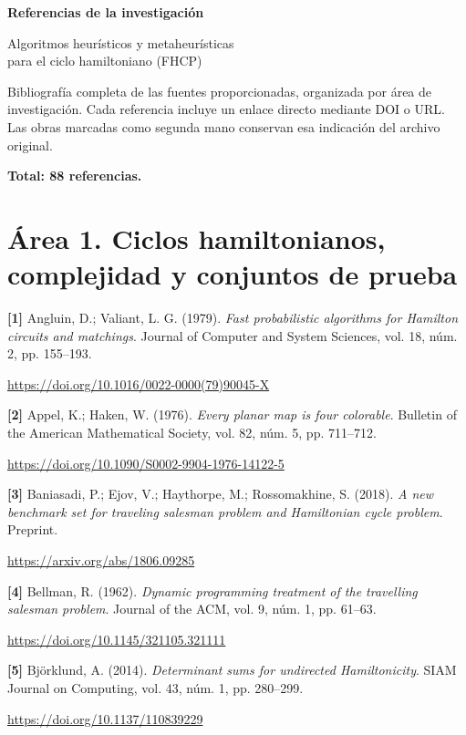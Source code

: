 \documentclass[11pt,a4paper]{article}
\newcommand{\referencia}[1]{\par\addvspace{0.8\baselineskip}\noindent\hangindent=1.1cm\hangafter=1 #1\par\nopagebreak}
\begin{document}
\begin{center}
{\LARGE\bfseries Referencias de la investigación}\par\medskip
{\large Algoritmos heurísticos y metaheurísticas\\para el ciclo hamiltoniano (FHCP)}
\end{center}
\medskip
Bibliografía completa de las fuentes proporcionadas, organizada por área de investigación. Cada referencia incluye un enlace directo mediante DOI o URL. Las obras marcadas como segunda mano conservan esa indicación del archivo original.
\par\medskip
\textbf{Total: 88 referencias.}
\section*{Área 1. Ciclos hamiltonianos, complejidad y conjuntos de prueba}
\begin{samepage}
\referencia{\textbf{[1]} Angluin, D.; Valiant, L. G. (1979). \textit{Fast probabilistic algorithms for {Hamilton} circuits and matchings}. Journal of Computer and System Sciences, vol. 18, núm. 2, pp. 155--193.}
 {\small\url{https://doi.org/10.1016/0022-0000(79)90045-X}}\par
\end{samepage}
\begin{samepage}
\referencia{\textbf{[2]} Appel, K.; Haken, W. (1976). \textit{Every planar map is four colorable}. Bulletin of the American Mathematical Society, vol. 82, núm. 5, pp. 711--712.}
 {\small\url{https://doi.org/10.1090/S0002-9904-1976-14122-5}}\par
\end{samepage}
\begin{samepage}
\referencia{\textbf{[3]} Baniasadi, P.; Ejov, V.; Haythorpe, M.; Rossomakhine, S. (2018). \textit{A new benchmark set for traveling salesman problem and {Hamiltonian} cycle problem}. Preprint.}
 {\small\url{https://arxiv.org/abs/1806.09285}}\par
\end{samepage}
\begin{samepage}
\referencia{\textbf{[4]} Bellman, R. (1962). \textit{Dynamic programming treatment of the travelling salesman problem}. Journal of the ACM, vol. 9, núm. 1, pp. 61--63.}
 {\small\url{https://doi.org/10.1145/321105.321111}}\par
\end{samepage}
\begin{samepage}
\referencia{\textbf{[5]} Bj{\"o}rklund, A. (2014). \textit{Determinant sums for undirected {Hamiltonicity}}. SIAM Journal on Computing, vol. 43, núm. 1, pp. 280--299.}
 {\small\url{https://doi.org/10.1137/110839229}}\par
\end{samepage}
\end{document}
